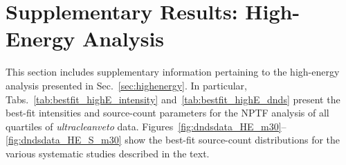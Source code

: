 \clearpage

\section{Supplementary Results:  High-Energy Analysis}
\label{app:suppanalysis_high}

This section includes supplementary information pertaining to the high-energy analysis presented in Sec.~\ref{sec:highenergy}.  In particular, Tabs.~\ref{tab:bestfit_highE_intensity} and~\ref{tab:bestfit_highE_dnds} present the best-fit intensities and source-count parameters for the NPTF analysis of all quartiles of {\it ultracleanveto} data.  Figures~\ref{fig:dndsdata_HE_m30}--\ref{fig:dndsdata_HE_S_m30} show the best-fit source-count distributions for the various systematic studies described in the text.

